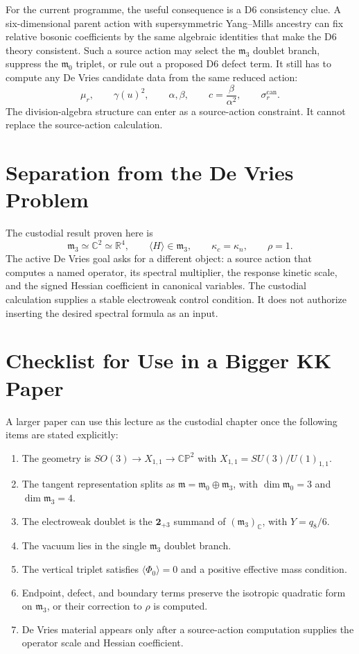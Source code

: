 \documentclass[11pt]{article}
\newcommand{\CP}{\mathbb{CP}}
\newcommand{\RR}{\mathbb{R}}
\newcommand{\CC}{\mathbb{C}}
\newcommand{\mzero}{\mathfrak m_0}
\newcommand{\mthree}{\mathfrak m_3}
\begin{document}
For the current programme, the useful consequence is a D6 consistency clue.
A six-dimensional parent action with supersymmetric Yang--Mills ancestry can
fix relative bosonic coefficients by the same algebraic identities that make
the D6 theory consistent.  Such a source action may select the \(\mthree\)
doublet branch, suppress the \(\mzero\) triplet, or rule out a proposed D6
defect term.  It still has to compute any De Vries candidate data from the
same reduced action:
\[
\mu_r,\qquad \gamma(u)^2,\qquad \alpha,\beta,\qquad
c=\frac{\beta}{\alpha^2},\qquad \sigma_r^{\mathrm{can}} .
\]
The division-algebra structure can enter as a source-action constraint.  It
cannot replace the source-action calculation.

\section{Separation from the De Vries Problem}

The custodial result proven here is
\[
\mthree\simeq\CC^2\simeq\RR^4,\qquad
\langle H\rangle\in\mthree,\qquad
\kappa_c=\kappa_n,\qquad
\rho=1 .
\]
The active De Vries goal asks for a different object: a source action that
computes a named operator, its spectral multiplier, the response kinetic
scale, and the signed Hessian coefficient in canonical variables.  The
custodial calculation supplies a stable electroweak control condition.  It
does not authorize inserting the desired spectral formula as an input.

\section{Checklist for Use in a Bigger KK Paper}

A larger paper can use this lecture as the custodial chapter once the
following items are stated explicitly:

\begin{enumerate}[leftmargin=2em]
  \item The geometry is \(SO(3)\to X_{1,1}\to\CP^2\) with
  \(X_{1,1}=SU(3)/U(1)_{1,1}\).
  \item The tangent representation splits as
  \(\mathfrak m=\mzero\oplus\mthree\), with \(\dim\mzero=3\) and
  \(\dim\mthree=4\).
  \item The electroweak doublet is the \(\mathbf 2_{+3}\) summand of
  \((\mthree)_{\CC}\), with \(Y=q_8/6\).
  \item The vacuum lies in the single \(\mthree\) doublet branch.
  \item The vertical triplet satisfies
  \(\langle\Phi_0\rangle=0\) and a positive effective mass condition.
  \item Endpoint, defect, and boundary terms preserve the isotropic
  quadratic form on \(\mthree\), or their correction to \(\rho\) is computed.
  \item De Vries material appears only after a source-action computation
  supplies the operator scale and Hessian coefficient.
\end{enumerate}
\end{document}
